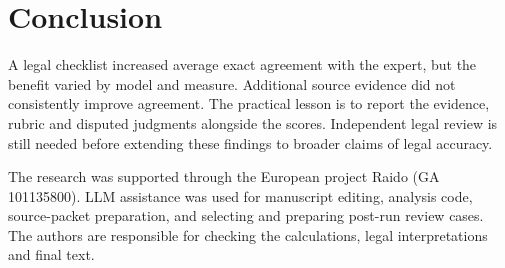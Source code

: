 \documentclass[sigconf,natbib=false,language=english]{acmart}
\begin{document}
\section{Conclusion}
A legal checklist increased average exact agreement with the expert, but the benefit varied by model and measure. Additional source evidence did not consistently improve agreement. The practical lesson is to report the evidence, rubric and disputed judgments alongside the scores. Independent legal review is still needed before extending these findings to broader claims of legal accuracy.

\begin{acks}
The research was supported through the European project Raido (GA 101135800). LLM assistance was used for manuscript editing, analysis code, source-packet preparation, and selecting and preparing post-run review cases. The authors are responsible for checking the calculations, legal interpretations and final text.
\end{acks}
\printbibliography
\end{document}
